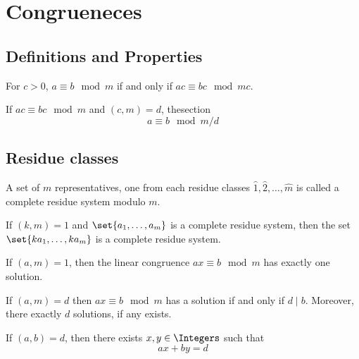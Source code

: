 \chapter{Congrueneces}
\section{Definitions and Properties}
\begin{theorem}
    For \(c > 0\), \(a \equiv b \mod m\) if and only if \(ac \equiv bc \mod mc\).
\end{theorem}

\begin{theorem}
    If \(ac \equiv bc \mod m\) and \((c,m) = d\), thesection
    \begin{equation*}
        a \equiv b \mod m/d
    \end{equation*}
\end{theorem}

\section{Residue classes}
\begin{definition}
    A set of \(m\) representatives, one from each residue classes \(\hat{1}, \hat{2} , \dots, \hat{m}\) is called a complete residue system modulo \(m\).
\end{definition}

\begin{theorem}
    If \((k,m) = 1\) and \(\set{a_1,\dots,a_m}\) is a complete residue system, then the set \(\set{ka_1,\dots, k a_m}\) is a complete residue system.
\end{theorem}

\begin{theorem}
    If \((a,m) = 1\), then the linear congruence \(ax \equiv b \mod m\) has exactly one solution.
\end{theorem}

\begin{theorem}
    If \((a,m) = d\) then \(ax \equiv b \mod m\) has a solution if and only if \(d \mid b\). Moreover, there exactly \(d\) solutions, if any exists.
\end{theorem}

\begin{theorem}
    If \((a,b) = d\), then there exists \(x,y \in \Integers\) such that 
    \begin{equation*}
        ax + by = d
    \end{equation*}
\end{theorem}

